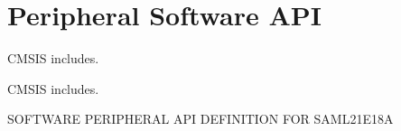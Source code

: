 \hypertarget{group___s_a_m_l21_e18_a__api}{}\section{Peripheral Software A\+P\+I}
\label{group___s_a_m_l21_e18_a__api}


C\+M\+S\+I\+S includes.  


C\+M\+S\+I\+S includes. 

S\+O\+F\+T\+W\+A\+R\+E P\+E\+R\+I\+P\+H\+E\+R\+A\+L A\+P\+I D\+E\+F\+I\+N\+I\+T\+I\+O\+N F\+O\+R S\+A\+M\+L21\+E18\+A 